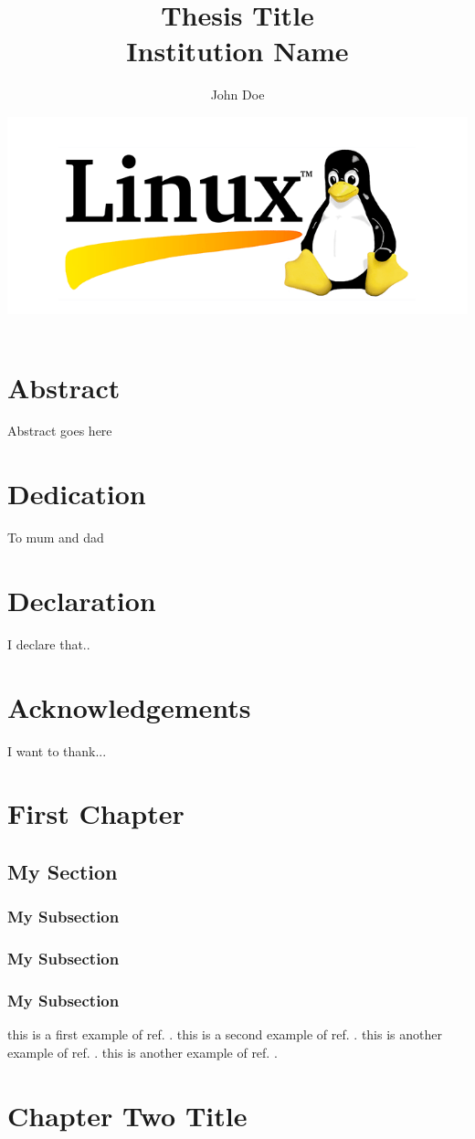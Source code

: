 \documentclass[12pt]{report}
\title{
	{\Huge{\bfseries Thesis Title}}\\
	{\large Institution Name}
}
\author{John Doe}
\date{
\vspace{1cm}
{\includegraphics[height=0.2\textheight,keepaspectratio]{university.png}}
}
\begin{document}
\maketitle

\chapter*{Abstract}
Abstract goes here

\chapter*{Dedication}
To mum and dad

\chapter*{Declaration}
I declare that..

\chapter*{Acknowledgements}
I want to thank...

\tableofcontents

\chapter{First Chapter}
%
\section{My Section}
\subsection{My Subsection}

\subsection{My Subsection}

\subsection{My Subsection}



this is a first example of ref. \cite{Testref98}.
this is a second example of ref. \cite{Testref98,lamport94}.
this is another example of ref. \cite{lamport94}.
this is another example of ref. \cite{lamport94}.


\chapter{Chapter Two Title}
%
\end{document}

